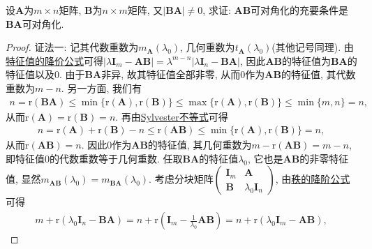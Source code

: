 \documentclass[../../main.tex]{subfiles}
\begin{document}
\begin{proposition}\label{proposition:矩阵乘积可对角化且可逆则交换后也可对角化}
设\(\boldsymbol{A}\)为\(m\times n\)矩阵, \(\boldsymbol{B}\)为\(n\times m\)矩阵, 又\(|\boldsymbol{B}\boldsymbol{A}|\neq 0\), 求证: \(\boldsymbol{A}\boldsymbol{B}\)可对角化的充要条件是\(\boldsymbol{B}\boldsymbol{A}\)可对角化.
\end{proposition}
\begin{proof}
{\color{blue}证法一:}
记其代数重数为\(m_{\boldsymbol{A}}(\lambda_0)\), 几何重数为\(t_{\boldsymbol{A}}(\lambda_0)\)(其他记号同理). 
由\hyperref[theorem:特征值的降价公式]{特征值的降价公式}可得\(|\lambda\boldsymbol{I}_m - \boldsymbol{A}\boldsymbol{B}| = \lambda^{m - n}|\lambda\boldsymbol{I}_n - \boldsymbol{B}\boldsymbol{A}|\), 因此\(\boldsymbol{A}\boldsymbol{B}\)的特征值为\(\boldsymbol{B}\boldsymbol{A}\)的特征值以及\(0\). 由于\(\boldsymbol{B}\boldsymbol{A}\)非异, 故其特征值全部非零, 从而\(0\)作为\(\boldsymbol{A}\boldsymbol{B}\)的特征值, 其代数重数为\(m - n\). 另一方面, 我们有
\begin{align*}
n = \mathrm{r}(\boldsymbol{B}\boldsymbol{A})\leqslant  \min\{\mathrm{r}(\boldsymbol{A}),\mathrm{r}(\boldsymbol{B})\}\leqslant  \max\{\mathrm{r}(\boldsymbol{A}),\mathrm{r}(\boldsymbol{B})\}\leqslant  \min\{m,n\} = n,
\end{align*}
从而\(\mathrm{r}(\boldsymbol{A}) = \mathrm{r}(\boldsymbol{B}) = n\). 再由\hyperref[proposition:Sylvester(西尔维斯特)不等式]{Sylvester不等式}可得
\begin{align*}
n = \mathrm{r}(\boldsymbol{A})+\mathrm{r}(\boldsymbol{B}) - n\leqslant  \mathrm{r}(\boldsymbol{A}\boldsymbol{B})\leqslant  \min\{\mathrm{r}(\boldsymbol{A}),\mathrm{r}(\boldsymbol{B})\} = n,
\end{align*}
从而\(\mathrm{r}(\boldsymbol{A}\boldsymbol{B}) = n\). 因此\(0\)作为\(\boldsymbol{A}\boldsymbol{B}\)的特征值, 其几何重数为\(m - \mathrm{r}(\boldsymbol{A}\boldsymbol{B}) = m - n\), 即特征值\(0\)的代数重数等于几何重数. 任取\(\boldsymbol{B}\boldsymbol{A}\)的特征值\(\lambda_0\), 它也是\(\boldsymbol{A}\boldsymbol{B}\)的非零特征值, 显然\(m_{\boldsymbol{A}\boldsymbol{B}}(\lambda_0) = m_{\boldsymbol{B}\boldsymbol{A}}(\lambda_0)\). 考虑分块矩阵\(\begin{pmatrix}
\boldsymbol{I}_m&\boldsymbol{A}\\
\boldsymbol{B}&\lambda_0\boldsymbol{I}_n
\end{pmatrix}\), 由\hyperref[proposition:秩的降阶公式]{秩的降阶公式}可得
\begin{align*}
m + \mathrm{r}(\lambda_0\boldsymbol{I}_n - \boldsymbol{B}\boldsymbol{A}) = n + \mathrm{r}(\boldsymbol{I}_m - \frac{1}{\lambda_0}\boldsymbol{A}\boldsymbol{B}) = n + \mathrm{r}(\lambda_0\boldsymbol{I}_m - \boldsymbol{A}\boldsymbol{B}),

\end{align*}
\end{proof}
\end{document}
